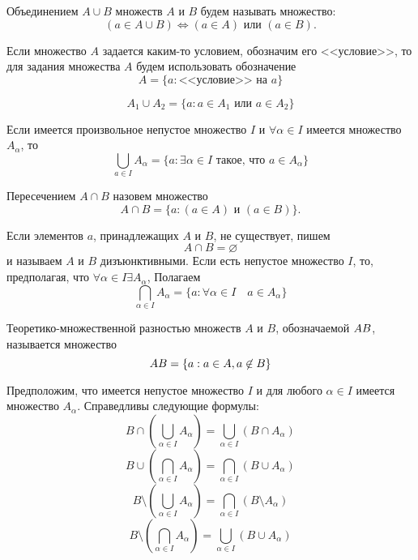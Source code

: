 \documentclass[main]{subfiles}
\begin{document}
Объединением $ A \cup B$ множеств $A$ и $B$ будем называть множество:
\[(a \in A \cup B) \Leftrightarrow (a \in A) \text{ или } (a \in B).\]

Если множество $A$ задается каким-то условием, обозначим его <<условие>>,
то для задания множества $A$ будем использовать обозначение
\[A=\{a:\text{<<условие>> на } a\}\]
\begin{example}
    \[A_1 \cup A_2 = \{a: a \in A_1 \text{ или } a \in A_2\} \]
\end{example}

Если имеется произвольное непустое множество $I$ и $\forall \alpha \in I$
имеется множество $A_\alpha$, то
\[\bigcup_{a \in I} A_\alpha = \{a: \exists \alpha \in I \text{ такое, что } a \in A_\alpha\}\]

Пересечением $A \cap B$ назовем множество
\[A \cap B = \{a: (a \in A) \text{ и } (a \in B)\}.\]

Если элементов $a$, принадлежащих $A$ и $B$, не существует, пишем
\[A \cap B = \varnothing\]
и называем $A$ и $B$ дизъюнктивными. Если есть непустое множество $I$,
то, предполагая, что $\forall\alpha\in I \exists A_\alpha$, Полагаем
\[\bigcap_{\alpha\in I} A_\alpha = \{a: \forall \alpha \in I \quad a \in A_\alpha\}\]

Теоретико-множественной разностью множеств $A$ и $B$, обозначаемой $A \\ B$,
называется множество
\[A \\ B = \{a: a\in A, a \not\in B\}\]

\begin{theorem}
    Предположим, что имеется непустое множество $I$ и для любого $\alpha \in I$
    имеется множество $A_\alpha$. Справедливы следующие формулы:
    \begin{equation}
        \label{thm:1.1}
        B \cap \left( \bigcup_{\alpha \in I} A_\alpha \right) =
        \bigcup_{\alpha \in I} (B \cap A_\alpha)
    \end{equation}
    \begin{equation}
        B \cup \left( \bigcap_{\alpha \in I} A_\alpha \right) =
        \bigcap_{\alpha \in I} (B \cup A_\alpha)
    \end{equation}
    \begin{equation}
        B \setminus \left( \bigcup_{\alpha \in I} A_\alpha \right) =
        \bigcap_{\alpha \in I} (B \setminus A_\alpha)
    \end{equation}
    \begin{equation}
        B \setminus \left( \bigcap_{\alpha \in I} A_\alpha \right) =
        \bigcup_{\alpha \in I} (B \cup A_\alpha)
    \end{equation}
\end{theorem}
\end{document}
